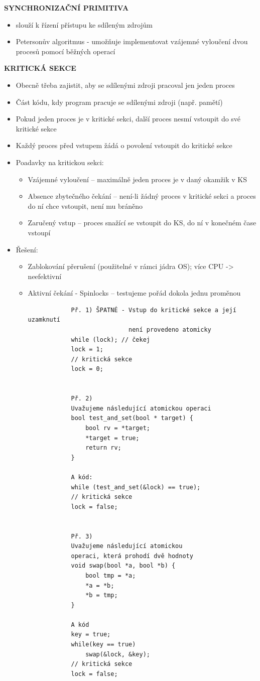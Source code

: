\documentclass[10pt,a4paper]{article}
\begin{document}
\textbf{SYNCHRONIZAČNÍ PRIMITIVA}
\begin{itemize}
	\item slouží k řízení přístupu ke sdíleným zdrojům
	\item Petersonův algoritmus - umožňuje implementovat vzájemné vyloučení dvou procesů pomocí běžných operací
\end{itemize}

\textbf{KRITICKÁ SEKCE}
\begin{itemize}
	\item Obecně třeba zajistit, aby se sdílenými zdroji pracoval jen jeden proces
	\item Část kódu, kdy program pracuje se sdílenými zdroji (např. pamětí)
	\item Pokud jeden proces je v kritické sekci, další proces nesmí vstoupit do své kritické sekce
	\item Každý proces před vstupem žádá o povolení vstoupit do kritické sekce
	\item Poadavky na kritickou sekci:
	\begin{itemize}
		\item Vzájemné vyloučení – maximálně jeden proces je v daný okamžik v KS
		\item Absence zbytečného čekání – není-li žádný proces v kritické sekci a proces do ní chce vstoupit, není mu bráněno
		\item Zaručený vstup – proces snažící se vstoupit do KS, do ní v konečném čase vstoupí
	\end{itemize}
	\item Řešení:
	\begin{itemize}
		\item Zablokování přerušení (použitelné v rámci jádra OS); více CPU -> neefektivní
		\item Aktivní čekání - Spinlocks – testujeme pořád dokola jednu proměnou 
		\begin{verbatim}
			Př. 1) ŠPATNÉ - Vstup do kritické sekce a její uzamknutí
			                není provedeno atomicky
			while (lock); // čekej 
			lock = 1; 
			// kritická sekce 
			lock = 0;
			
			
			Př. 2)
			Uvažujeme následující atomickou operaci 
			bool test_and_set(bool * target) {
				bool rv = *target; 
				*target = true; 
				return rv; 
			}
				
			A kód:
			while (test_and_set(&lock) == true);
			// kritická sekce 
			lock = false;
			
			
			Př. 3)
			Uvažujeme následující atomickou 
			operaci, která prohodí dvě hodnoty 
			void swap(bool *a, bool *b) {
				bool tmp = *a; 
				*a = *b; 
				*b = tmp; 
			}
			
			A kód 
			key = true;
			while(key == true) 
				swap(&lock, &key); 
			// kritická sekce 
			lock = false;
		\end{verbatim}
	\end{itemize}
\end{itemize}
\end{document}

